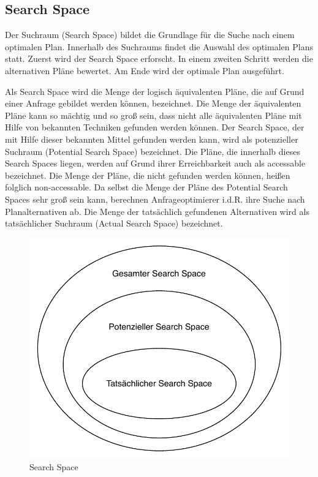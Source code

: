 \subsection{Search Space}

Der Suchraum (Search Space) bildet die Grundlage für die Suche nach einem optimalen Plan. Innerhalb des Suchraums findet die Auswahl des optimalen Plans statt. 
Zuerst wird der Search Space erforscht. In einem zweiten Schritt werden die alternativen Pläne bewertet. Am Ende wird der optimale Plan ausgeführt.



Als Search Space wird die Menge der logisch äquivalenten Pläne, die auf Grund einer Anfrage gebildet werden können, bezeichnet. Die Menge der äquivalenten Pläne kann so mächtig und so groß sein, dass nicht alle äquivalenten Pläne mit Hilfe von bekannten Techniken gefunden werden können.  Der Search Space, der mit Hilfe dieser bekannten Mittel gefunden werden kann, wird als potenzieller Suchraum (Potential Search Space) bezeichnet. Die Pläne, die innerhalb dieses Search Spaces liegen, werden auf Grund ihrer Erreichbarkeit auch als accessable bezeichnet. Die Menge der Pläne, die nicht gefunden werden können, heißen folglich non-accessable. Da selbst die Menge der Pläne des Potential Search Spaces sehr groß sein kann, berechnen Anfrageoptimierer i.d.R. ihre Suche nach Planalternativen ab. Die Menge der tatsächlich gefundenen Alternativen wird als tatsächlicher Suchraum (Actual Search Space) bezeichnet.


\begin{figure}[h]
  \centering
  \includegraphics{02_Related_Work/SearchSpace.pdf}
  \caption{Search Space}
  \label{SearchSpace}
\end{figure}

